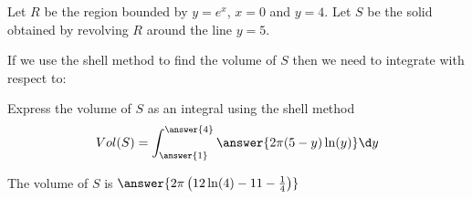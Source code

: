\documentclass{ximera}
\author{Jason Miller}
\begin{document}
\begin{exercise}
Let $R$ be the region bounded by $y=e^{x}$, $x=0$ and $y=4$. Let $S$ be the solid obtained by revolving $R$ around the line $y=5$.


If we use the shell method to find the volume of $S$ then we need to integrate with respect to:

 \begin{multipleChoice}
  \end{multipleChoice}

\begin{exercise}
Express the volume of $S$ as an integral using the shell method
\[
Vol(S)=\int_{\answer{1}}^{\answer{4}} \answer{2\pi (5-y) \ln(y) } \d y
\]

The volume of $S$ is $\answer{  2\pi \left( 12 \ln(4)-11-\frac{1}{4} \right)  }$


\end{exercise}
\end{exercise}
\end{document}
